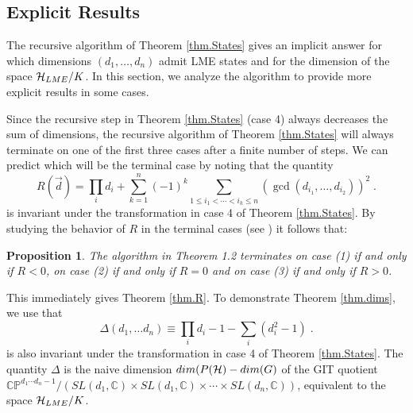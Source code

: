 \documentclass[12pt]{article}
\newtheorem{proposition}[theorem]{Proposition}
\theoremstyle{definition}
\newcommand{\be}{\begin{equation}}
\newcommand{\ee}{\end{equation}}
\begin{document}
\subsection{Explicit Results}

The recursive algorithm of Theorem \ref{thm.States} gives an implicit answer for which dimensions $(d_1, \dots, d_n)$ admit LME states and for the dimension of the space ${\cal H}_{LME}/K$. In this section, we analyze the algorithm to provide more explicit results in some cases.

Since the recursive step in Theorem \ref{thm.States} (case 4) always decreases the sum of dimensions, the recursive algorithm of Theorem \ref{thm.States} will always terminate on one of the first three cases after a finite number of steps. We can predict which will be the terminal case by noting that
the quantity
\be
R(\vec{d}) = \prod_i d_i + \sum_{k=1}^n (-1)^k \sum_{1 \le i_1 < \cdots < i_k \le n} (\gcd(d_{i_1},\dots,d_{i_2}))^2 \; .
\ee
is invariant under the transformation in case 4 of Theorem \ref{thm.States}. By studying the behavior of $R$ in the terminal cases (see \cite{mathpaper}) it follows that:
\begin{proposition}\label{prop:Rcases}
The algorithm in Theorem 1.2 terminates on case (1) if and only if $R<0$, on case (2) if and only if $R=0$ and on case (3) if and only if $R>0$.
\end{proposition}
This immediately gives Theorem \ref{thm.R}. To demonstrate Theorem \ref{thm.dims}, we use that
\be
\label{defDelta}
\Delta(d_1, \dots d_n) \equiv \prod_i d_i - 1 - \sum_i (d_i^2 - 1)   \; .
\ee
is also invariant under the transformation in case 4 of Theorem \ref{thm.States}. The quantity $\Delta$ is the naive dimension $dim(P({\cal H}) - dim(G)$ of the GIT quotient $\mathbb{CP}^{d_1 \cdots d_n - 1}/(SL(d_1, \mathbb{C}) \times SL(d_1, \mathbb{C}) \times \cdots \times SL(d_n, \mathbb{C}))$, equivalent to the space ${\cal H}_{LME}/K$.
\end{document}
